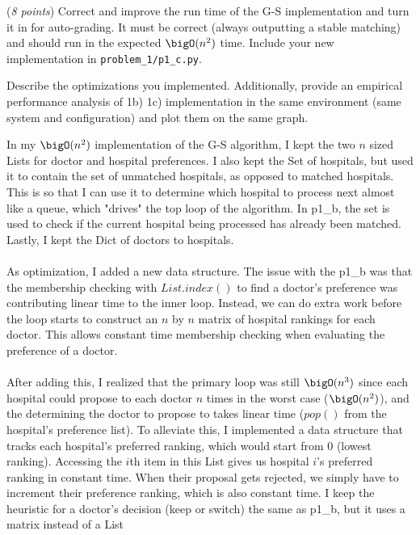\documentclass{hw_template}
\begin{document}
\begin{problem}
\begin{subproblem}
\newcommand{\worstrank}{{\tt wr}}
  (\textit{8 points})
    Correct and improve the run time of the G-S implementation and turn it in for auto-grading. It must be correct (always outputting a stable matching) and should run in the expected $\bigO(n^2)$ time. Include your new implementation in \texttt{problem\_1/p1\_c.py}. 
    
    Describe the optimizations you implemented. Additionally, provide an empirical performance analysis of 1b) 1c) implementation in the same environment (same system and configuration) and plot them on the same graph. 
\end{subproblem}

\begin{solution}
In my $\bigO(n^2)$ implementation of the G-S algorithm, I kept the two $n$ sized 
Lists for doctor and hospital preferences. I also kept the Set of hospitals, but used it to contain the set of 
unmatched hospitals, as opposed to matched hospitals. This is so that I can use it to determine which hospital to 
process next almost like a queue, which "drives" the top loop of the algorithm. In p1\_b, the set is used to check 
if the current hospital being processed has already been matched. Lastly, I kept the Dict of doctors to hospitals.
\\\\
As optimization, I added a new data structure. The issue with the p1\_b was that the membership checking with $List.index()$
to find a doctor's preference was contributing linear time to the inner loop. Instead, we can do extra work before the 
loop starts to construct an $n$ by $n$ matrix of hospital rankings for each doctor. This allows constant time membership checking 
when evaluating the preference of a doctor.
\\\\
After adding this, I realized that the primary loop was still $\bigO(n^3)$ since each hospital could propose to each
doctor $n$ times in the worst case ($\bigO(n^2)$), and the determining the doctor to propose to takes linear time ($pop()$ 
from the hospital's preference list). To alleviate this, I implemented a data structure that tracks each hospital's preferred ranking, 
which would start from 0 (lowest ranking). Accessing the $i$th item in this List gives us hospital $i$'s preferred ranking in 
constant time. When their proposal gets rejected, we simply have to increment their preference ranking, which is also constant 
time. I keep the heuristic for a doctor's decision (keep or switch) the same as p1\_b, but it uses a matrix instead of a List 

\end{solution}
\end{problem}
\end{document}
